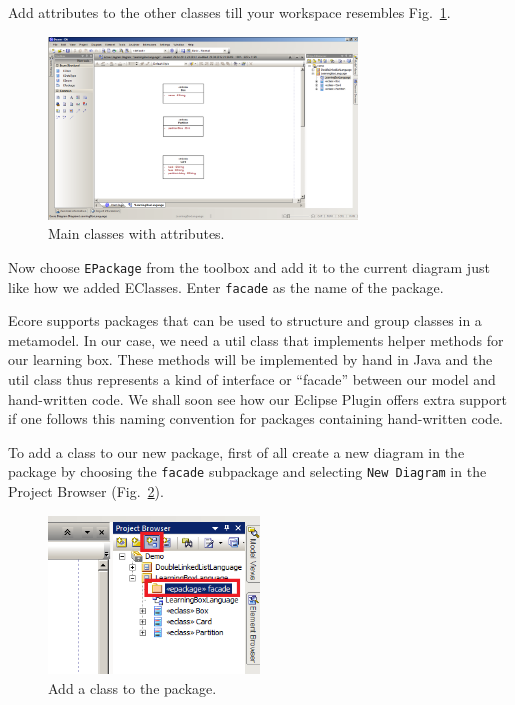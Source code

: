 Add attributes to the other classes till your workspace resembles
Fig.~\ref{fig:attribute_completed}.

\begin{figure}[htbp]
	\centering
  \includegraphics[width=0.73\textwidth]{pics/memBoxBilder/memBox14.png}
	\caption{Main classes with attributes.}
	\label{fig:attribute_completed}
\end{figure}


Now choose \texttt{EPackage} from the toolbox and add it to the current diagram
just like how we added EClasses. Enter \texttt{facade} as the name of the
package. 
 
Ecore supports packages that can be used to structure and group classes
in a metamodel.  In our case, we need  a util class that implements helper
methods for our learning box.  These methods  will be implemented by hand in Java
and the util class thus represents a kind of  interface or ``facade'' between
our model and hand-written code.  We shall soon  see how our Eclipse Plugin
offers extra support if one follows this naming  convention for packages
containing hand-written code. 

To add a class to our new package, first of all create a new diagram in
the package by choosing the \texttt{facade} subpackage and selecting \texttt{New
Diagram} in the Project Browser (Fig.~\ref{fig:epackage_newelement}).

\begin{figure}[htbp]
	\centering
  \includegraphics[width=0.5\textwidth]{pics/memBoxBilder/memBox19}
	\caption{Add a class to the package.}
	\label{fig:epackage_newelement}
\end{figure}

